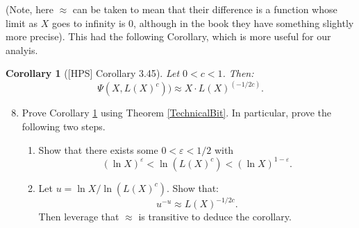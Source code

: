 \documentclass[11pt]{article}
\newtheorem{corollary}{Corollary}
\begin{document}
(Note, here $\approx$ can be taken to mean that their difference is a function whose limit as $X$ goes to infinity is $0$, although in the book they have something slightly more precise).  This had the following Corollary, which is more useful for our analyis.
\begin{corollary}[{[HPS] Corollary 3.45}]\label{technicalCorollary}
  Let $0<c<1$.  Then:
  \[\Psi(X,L(X)^c))\approx X\cdot L(X)^{(-1/2c)}.\]
\end{corollary}
\begin{enumerate}
  \setcounter{enumi}{7}
  \item{
  Prove Corollary \ref{technicalCorollary} using Theorem \ref{TechnicalBit}.  In particular, prove the following two steps.
  \begin{enumerate}
    \item{
      Show that there exists some $0<\varepsilon<1/2$ with
      \[(\ln X)^\varepsilon < \ln (L(X)^c) < (\ln X)^{1-\varepsilon}.\]
    }
    \item{
    Let $u = \ln X/\ln(L(X)^c)$.  Show that:
    \[u^{-u}\approx L(X)^{-1/2c}.\]
    Then leverage that $\approx$ is transitive to deduce the corollary.
    }
  \end{enumerate}
  }
\end{enumerate}
\end{document}
